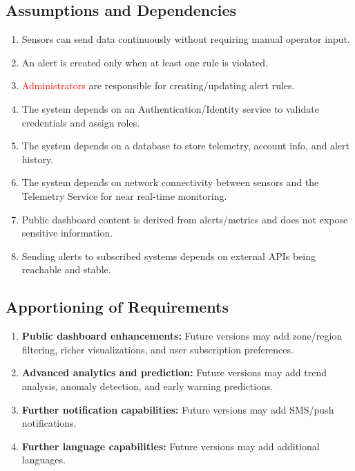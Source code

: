 {\subsection{Assumptions and Dependencies}
\label{sub:assumptions_and_dependencies}
\begin{enumerate}
    \item Sensors can send data continuously without requiring manual operator input.
    \item An alert is created only when at least one rule is violated.
    \item \textcolor{red}{Administrators} are responsible for creating/updating alert rules.
    \item The system depends on an Authentication/Identity service to validate credentials and assign roles.
    \item The system depends on a database to store telemetry, account info, and alert history.
    \item The system depends on network connectivity between sensors and the Telemetry Service for near real-time monitoring.
    \item Public dashboard content is derived from alerts/metrics and does not expose sensitive information.
    \item Sending alerts to subscribed systems depends on external APIs being reachable and stable.

\end{enumerate}

\subsection{Apportioning of Requirements}
\label{sub:apportioning_of_requirements}
\begin{enumerate}
    \item \textbf{Public dashboard enhancements:} Future versions may add zone/region filtering, richer visualizations, and user subscription preferences.
	\item \textbf{Advanced analytics and prediction:} Future versions may add trend analysis, anomaly detection, and early warning predictions.
    \item \textbf{Further notification capabilities:} Future versions may add SMS/push notifications.
    \item \textbf{Further language capabilities:} Future versions may add additional languages.
\end{enumerate}
}